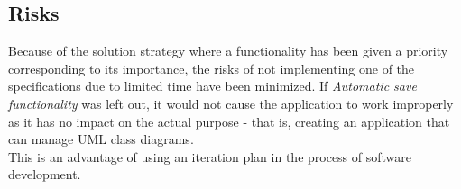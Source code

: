 \subsection{Risks}

Because of the solution strategy where a functionality has been given a priority corresponding to its importance, the risks of not implementing one of the specifications due to limited time have been minimized. If \textit{Automatic save functionality} was left out, it would not cause the application to work improperly as it has no impact on the actual purpose - that is, creating an application that can manage UML class diagrams.\\
This is an advantage of using an iteration plan in the process of software development.
